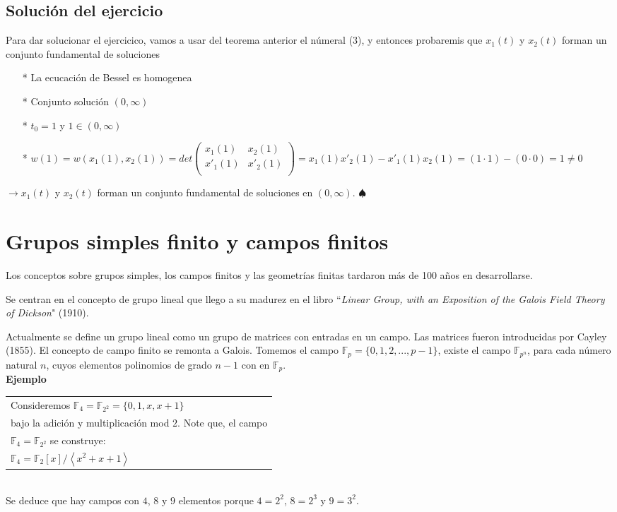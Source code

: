 \documentclass{article}
\numberwithin{equation}{section}
\theoremstyle{plain}  %
\begin{document}
\subsection*{Solución del ejercicio}
Para dar solucionar el ejercicico, vamos a usar del teorema anterior el númeral (3), y entonces probaremis que $x_{1}(t)$ y $x_{2}(t)$ forman un conjunto fundamental de soluciones
\begin{itemize}
    \item[*] La ecucación de Bessel es homogenea 
    \item[*] Conjunto solución $(0, \infty)$
    \item[*] $t_{0}=1$ y $1 \in (0, \infty)$
    \item[*] $w(1) = w(x_{1}(1),x_{2}(1))= det
        \begin{pmatrix}
            x_{1}(1) & x_{2}(1)  \\
            x'_{1}(1) & x'_{2}(1)  \\
        \end{pmatrix} =  x_{1}(1) x'_{2}(1) -  x'_{1}(1) x_{2}(1) = (1 \cdot 1) -(0 \cdot 0) = 1 \not = 0$
\end{itemize}
$\to x_{1}(t)$ y $ x_{2}(t)$ forman un conjunto fundamental de soluciones en $(0, \infty)$.
$\spadesuit$ 
\section{Grupos simples finito y campos finitos}
Los conceptos sobre grupos simples, los campos finitos y las geometrías finitas 
tardaron más de 100 años en desarrollarse.\newline

Se centran en el concepto de grupo lineal que llego a su madurez en el libro
``\textit{Linear Group, with an Exposition of the Galois Field Theory of Dickson}" (1910).
\newline

Actualmente se define un grupo lineal como un grupo de matrices con entradas en un 
campo. Las matrices fueron introducidas por Cayley (1855).
El concepto de campo finito se remonta a Galois. Tomemos el campo 
$\mathbb{F}_p = \{0, 1, 2, ..., p-1 \}$, existe el campo $\mathbb{F}_{p^n}$, 
para cada número natural $n$, cuyos elementos polinomios de grado $n-1$ con 
 en $\mathbb{F}_p$.
\\ 
\textbf{Ejemplo} \\
\begin{tabular}{|l|}
    \hline 
    Consideremos $\mathbb{F}_4 = \mathbb{F}_{2^2} = \{0, 1, x, x+1 \}$\\
    bajo la adición y multiplicación mod $2$. Note que, el campo \\
    $\mathbb{F}_4 = \mathbb{F}_{2^2}$ se construye:\\
    $\mathbb{F}_4 = \mathbb{F}_2\left[x \right] / \left<x^2 + x + 1 \right>$ \\ \hline
\end{tabular} \\
Se deduce que hay campos con $4$, $8$ y $9$ elementos porque $4=2^2$, $8=2^3$ y $9=3^2$.
\end{document}
